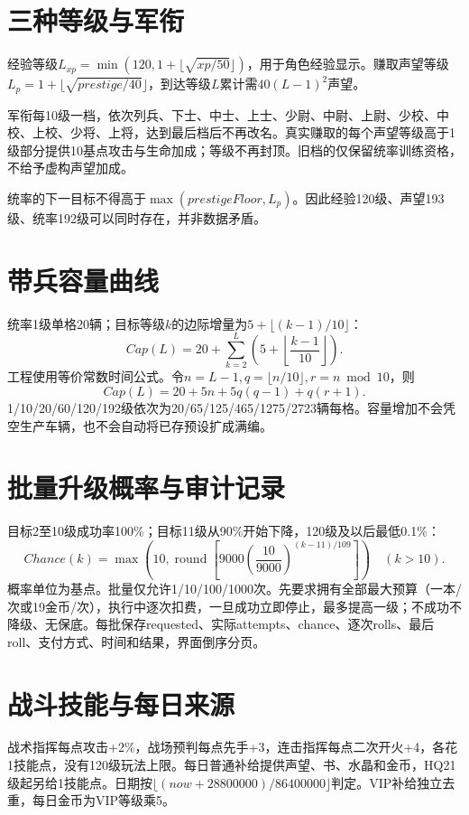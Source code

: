 \section{三种等级与军衔}
经验等级\(L_{xp}=\min(120,1+\lfloor\sqrt{xp/50}\rfloor)\)，用于角色经验显示。赚取声望等级\(L_p=1+\lfloor\sqrt{prestige/40}\rfloor\)，到达等级\(L\)累计需\(40(L-1)^2\)声望。

军衔每10级一档，依次列兵、下士、中士、上士、少尉、中尉、上尉、少校、中校、上校、少将、上将，达到最后档后不再改名。真实赚取的每个声望等级高于1级部分提供10基点攻击与生命加成；等级不再封顶。旧档的仅保留统率训练资格，不给予虚构声望加成。

统率的下一目标不得高于\(\max(prestigeFloor,L_p)\)。因此经验120级、声望193级、统率192级可以同时存在，并非数据矛盾。

\section{带兵容量曲线}
统率1级单格20辆；目标等级\(k\)的边际增量为\(5+\lfloor(k-1)/10\rfloor\)：
\[
Cap(L)=20+\sum_{k=2}^{L}\left(5+\left\lfloor\frac{k-1}{10}\right\rfloor\right).
\]
工程使用等价常数时间公式。令\(n=L-1,q=\lfloor n/10\rfloor,r=n\bmod10\)，则
\[
Cap(L)=20+5n+5q(q-1)+q(r+1).
\]
1/10/20/60/120/192级依次为20/65/125/465/1275/2723辆每格。容量增加不会凭空生产车辆，也不会自动将已存预设扩成满编。

\section{批量升级概率与审计记录}
目标2至10级成功率100\%；目标11级从90\%开始下降，120级及以后最低0.1\%：
\[
Chance(k)=\max\!\left(10,\operatorname{round}\left[9000\left(\frac{10}{9000}\right)^{(k-11)/109}\right]\right)
\quad(k>10).
\]
概率单位为基点。批量仅允许1/10/100/1000次。先要求拥有全部最大预算（一本/次或19金币/次），执行中逐次扣费，一旦成功立即停止，最多提高一级；不成功不降级、无保底。每批保存requested、实际attempts、chance、逐次rolls、最后roll、支付方式、时间和结果，界面倒序分页。

\section{战斗技能与每日来源}
战术指挥每点攻击+2\%，战场预判每点先手+3，连击指挥每点二次开火+4，各花1技能点，没有120级玩法上限。每日普通补给提供声望、书、水晶和金币，HQ21级起另给1技能点。日期按\(\lfloor(now+28800000)/86400000\rfloor\)判定。VIP补给独立去重，每日金币为VIP等级乘5。
